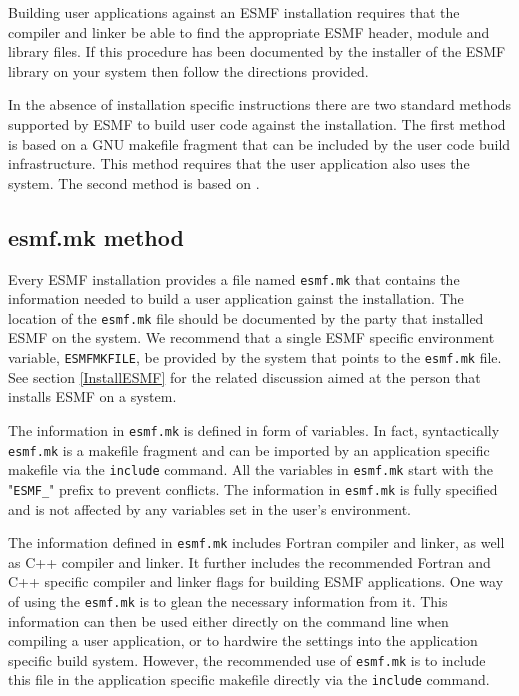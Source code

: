 
Building user applications against an ESMF installation requires that the 
compiler and linker be able to find the appropriate ESMF header, module and 
library files. If this procedure has been documented by the installer of the 
ESMF library on your system then follow the directions provided.

In the absence of installation specific instructions there are two standard
methods supported by ESMF to build user code against the installation. The
first method is based on a GNU makefile fragment that can be included by the
user code build infrastructure. This method requires that the user application
also uses the
system. The second method is based on 
.


\subsection{esmf.mk method}
\label{sec:EsmfMkMethod}

Every ESMF installation provides a file named {\tt esmf.mk} that contains the 
information needed to build a user application gainst the installation. The
location of the {\tt esmf.mk} file should be documented by the party that
installed ESMF on the system. We recommend that a single ESMF specific 
environment variable, {\tt ESMFMKFILE}, be provided by the system that points to 
the {\tt esmf.mk} file. See section \ref{InstallESMF} for the related discussion 
aimed at the person that installs ESMF on a system.

The information in {\tt esmf.mk} is defined in form of variables. In fact, 
syntactically {\tt esmf.mk} is a makefile fragment and can be imported by an 
application specific makefile via the {\tt include} command. All the variables 
in {\tt esmf.mk} start with the "{\tt ESMF\_}" prefix to prevent conflicts. The 
information in {\tt esmf.mk} is fully specified and is not affected by any 
variables set in the user's environment.

The information defined in {\tt esmf.mk} includes Fortran compiler and linker, 
as well as C++ compiler and linker. It further includes the recommended Fortran 
and C++ specific compiler and linker flags for building ESMF applications. One 
way of using the {\tt esmf.mk} is to glean the necessary information from it. 
This information can then be used either directly on the command line when 
compiling a user application, or to hardwire the settings into the application 
specific build system. However, the recommended use of {\tt esmf.mk} is to 
include this file in the application specific makefile directly via the 
{\tt include} command.

